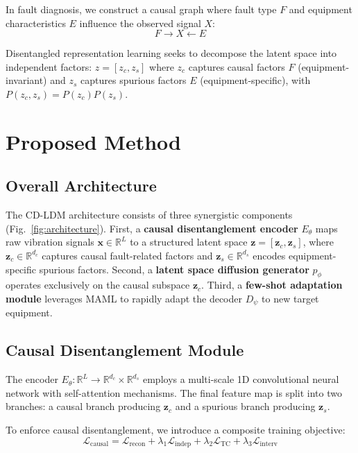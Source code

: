 \documentclass[lettersize,journal]{IEEEtran}
\begin{document}
In fault diagnosis, we construct a causal graph where fault type $F$ and equipment characteristics $E$ influence the observed signal $X$:
\begin{equation}
F \rightarrow X \leftarrow E
\end{equation}

Disentangled representation learning seeks to decompose the latent space into independent factors: $z = [z_c, z_s]$ where $z_c$ captures causal factors $F$ (equipment-invariant) and $z_s$ captures spurious factors $E$ (equipment-specific), with $P(z_c, z_s) = P(z_c)P(z_s)$.

\section{Proposed Method}

\subsection{Overall Architecture}

The CD-LDM architecture consists of three synergistic components (Fig.~\ref{fig:architecture}). First, a \textbf{causal disentanglement encoder} $E_\theta$ maps raw vibration signals $\mathbf{x} \in \mathbb{R}^{L}$ to a structured latent space $\mathbf{z} = [\mathbf{z}_c, \mathbf{z}_s]$, where $\mathbf{z}_c \in \mathbb{R}^{d_c}$ captures causal fault-related factors and $\mathbf{z}_s \in \mathbb{R}^{d_s}$ encodes equipment-specific spurious factors. Second, a \textbf{latent space diffusion generator} $p_\phi$ operates exclusively on the causal subspace $\mathbf{z}_c$. Third, a \textbf{few-shot adaptation module} leverages MAML to rapidly adapt the decoder $D_\psi$ to new target equipment.

\subsection{Causal Disentanglement Module}

The encoder $E_\theta: \mathbb{R}^L \rightarrow \mathbb{R}^{d_c} \times \mathbb{R}^{d_s}$ employs a multi-scale 1D convolutional neural network with self-attention mechanisms. The final feature map is split into two branches: a causal branch producing $\mathbf{z}_c$ and a spurious branch producing $\mathbf{z}_s$.

To enforce causal disentanglement, we introduce a composite training objective:
\begin{equation}
\mathcal{L}_{\text{causal}} = \mathcal{L}_{\text{recon}} + \lambda_1 \mathcal{L}_{\text{indep}} + \lambda_2 \mathcal{L}_{\text{TC}} + \lambda_3 \mathcal{L}_{\text{interv}}
\end{equation}
\end{document}
